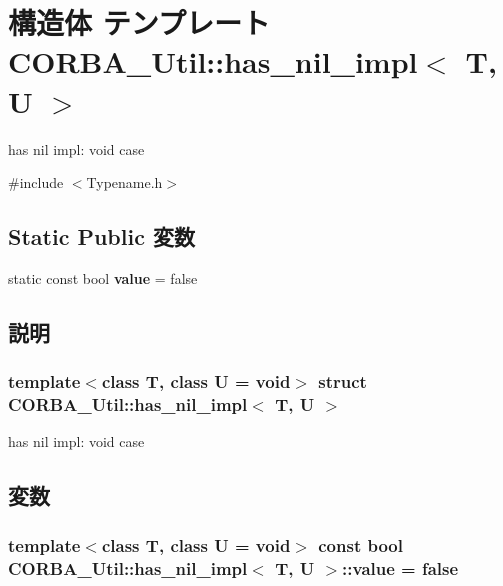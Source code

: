 \section{構造体 テンプレート CORBA\_\-Util::has\_\-nil\_\-impl$<$ T, U $>$}
\label{structCORBA__Util_1_1has__nil__impl}


has nil impl: void case  




{\ttfamily \#include $<$Typename.h$>$}

\subsection*{Static Public 変数}
\begin{DoxyCompactItemize}
\item 
static const bool {\bf value} = false
\end{DoxyCompactItemize}


\subsection{説明}
\subsubsection*{template$<$class T, class U = void$>$ struct CORBA\_\-Util::has\_\-nil\_\-impl$<$ T, U $>$}

has nil impl: void case 

\subsection{変数}
\subsubsection[{value}]{\setlength{\rightskip}{0pt plus 5cm}template$<$class T, class U = void$>$ const bool {\bf CORBA\_\-Util::has\_\-nil\_\-impl}$<$ T, U $>$::{\bf value} = false\hspace{0.3cm}{\ttfamily  [static]}}\label{structCORBA__Util_1_1has__nil__impl_aa27da7b5dbbe553ba9cef2c86adcf68b}
